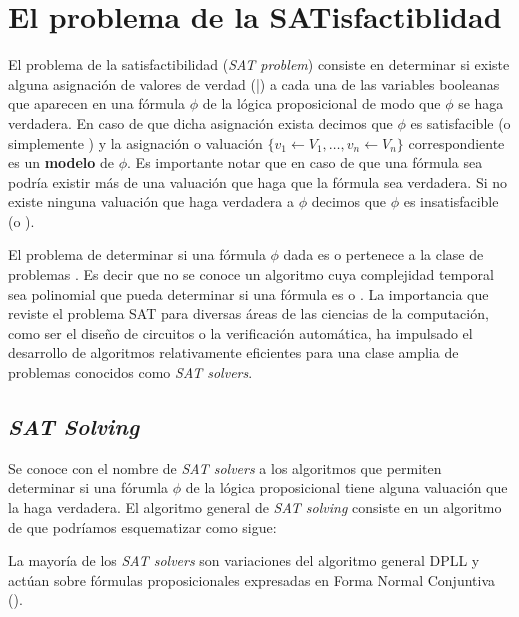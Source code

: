 \newcommand{\disj}[1]{\ensuremath{[#1]}}
\newcommand{\conj}[1]{\ensuremath{\{#1\}}}

\section{El problema de la SATisfactiblidad}

El problema de la satisfactibilidad (\emph{SAT problem}) consiste en determinar
si existe alguna asignación de valores de verdad (\true|\false) a cada una de
las variables booleanas que aparecen en una fórmula $\phi$ de la lógica
proposicional de modo que $\phi$ se haga verdadera. En caso de que dicha
asignación exista decimos que $\phi$ es satisfacible (o simplemente \sat) y la
asignación o valuación $\{ v_1 \leftarrow V_1, \ldots, v_n \leftarrow V_n \}$
correspondiente es un \textbf{modelo} de $\phi$. Es importante notar que en caso
de que una fórmula sea \sat podría existir más de una valuación que haga que la
fórmula sea verdadera. Si no existe ninguna valuación que haga verdadera a
$\phi$ decimos que $\phi$ es insatisfacible (o \unsat).

El problema de determinar si una fórmula $\phi$ dada es \sat o \unsat pertenece
a la clase de problemas \npc\cite{Cook:1971:CTP:800157.805047}. Es decir que no
se conoce un algoritmo cuya complejidad temporal sea polinomial que pueda determinar si una fórmula es \sat
o \unsat. La importancia que reviste el problema SAT para diversas áreas de las
ciencias de la computación, como ser el diseño de circuitos o la verificación
automática, ha impulsado el desarrollo de algoritmos relativamente eficientes
para una clase amplia de problemas conocidos como \emph{SAT solvers}.

\subsection{\emph{SAT Solving}}

Se conoce con el nombre de \emph{SAT solvers} a los algoritmos que permiten
determinar si una fórumla $\phi$ de la lógica proposicional tiene alguna
valuación que la haga verdadera. El algoritmo general de  \emph{SAT solving}
consiste en un algoritmo de \bt que podríamos esquematizar como sigue:


La mayoría de los \emph{SAT solvers} son
variaciones del algoritmo general
DPLL\cite{Davis:1962:MPT:368273.368557} y actúan sobre fórmulas
proposicionales expresadas en Forma Normal Conjuntiva (\cnf).

